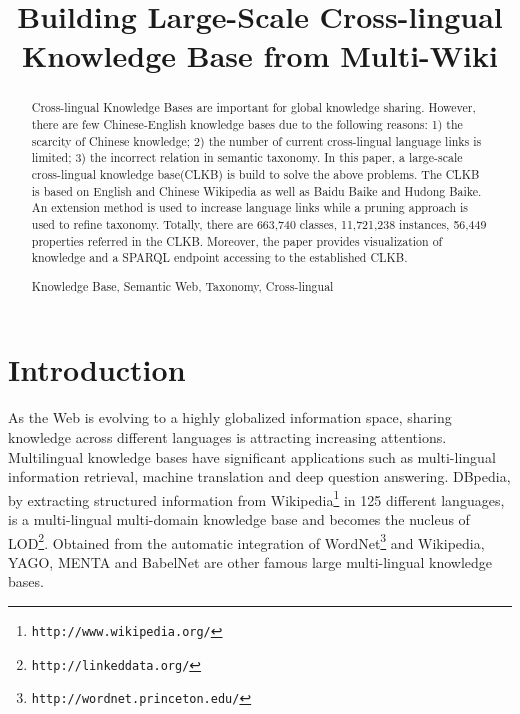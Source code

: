 \documentclass[runningheads,a4paper]{llncs}
\newcommand{\keywords}[1]{\par\addvspace\baselineskip\noindent\keywordname\enspace\ignorespaces#1}
\begin{document}
\mainmatter

\title{Building Large-Scale Cross-lingual Knowledge Base from Multi-Wiki}


\maketitle

\begin{abstract}
Cross-lingual Knowledge Bases are important for global knowledge sharing. However, there are few Chinese-English knowledge bases due to the following reasons: 1) the scarcity of Chinese knowledge; 2) the number of current cross-lingual language links is limited; 3) the incorrect relation in semantic taxonomy. In this paper, a large-scale cross-lingual knowledge base(CLKB) is build to solve the above problems. The CLKB is based on English and Chinese Wikipedia as well as Baidu Baike and Hudong Baike. An extension method is used to increase language links while a pruning approach is used to refine taxonomy. Totally, there are 663,740 classes, 11,721,238 instances, 56,449 properties referred in the CLKB. Moreover, the paper provides visualization of knowledge and a SPARQL endpoint accessing to the established CLKB.

\keywords{Knowledge Base, Semantic Web, Taxonomy, Cross-lingual}
\end{abstract}

\section{Introduction}
As the Web is evolving to a highly globalized information space, sharing knowledge across different languages is attracting increasing attentions. Multilingual knowledge bases have significant applications such as multi-lingual information retrieval, machine translation and deep question answering. DBpedia, by extracting structured information from Wikipedia\footnote{{\tt http://www.wikipedia.org/}} in 125 different languages, is a multi-lingual multi-domain knowledge base and becomes the nucleus of LOD\footnote{{\tt http://linkeddata.org/}}. Obtained from the automatic integration of WordNet\footnote{{\tt http://wordnet.princeton.edu/}} and Wikipedia, YAGO, MENTA and BabelNet are other famous large multi-lingual knowledge bases.
\end{document}
